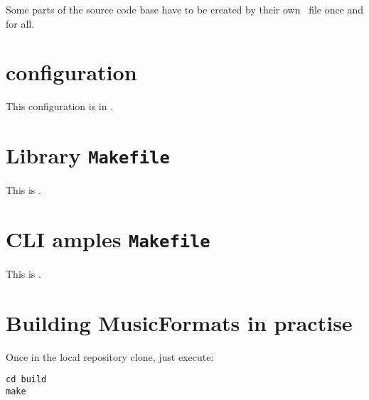 Some parts of the source code base have to be created by their own \make\ file once and for all. %


\section{{\tt \cmake} configuration}

This configuration is in .


\section{Library {\tt Makefile}}

This  is .


\section{CLI amples {\tt Makefile}}

This  is .


\section{Building MusicFormats in practise}

Once in the local repository clone, just execute:
\begin{lstlisting}[language=Terminal]
cd build
make
\end{lstlisting}

